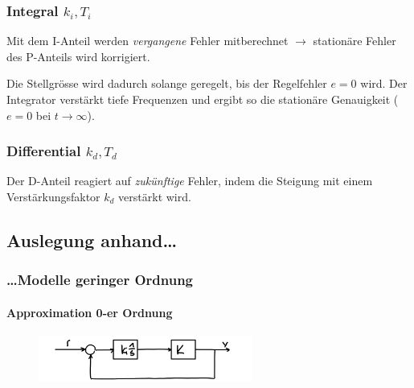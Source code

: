 \documentclass[
  10pt,
  a4paper,
  twocolumn]{article}
\let\oldparagraph\paragraph
\renewcommand{\paragraph}[1]{\oldparagraph{#1}\mbox{}}
\numberwithin{equation}{section}
\let\paragraph\oldparagraph
\renewcommand{\paragraph}[1]{\oldparagraph{#1}\mbox{}\par}
\begin{document}
\hypertarget{k_it_i}{%
\subsubsection{\texorpdfstring{\textcolor{NavyBlue}{Integral}
\(k_i,T_i\)}{ k\_i,T\_i}}\label{k_it_i}}

Mit dem I-Anteil werden \emph{vergangene} Fehler mitberechnet
\(\rightarrow\) stationäre Fehler des P-Anteils wird korrigiert.

Die Stellgrösse wird dadurch solange geregelt, bis der Regelfehler
\(e=0\) wird. Der Integrator verstärkt tiefe Frequenzen und ergibt so
die stationäre Genauigkeit ( \(e=0\) bei \(t\rightarrow\infty\)).

\hypertarget{k_dt_d}{%
\subsubsection{\texorpdfstring{\textcolor{OliveGreen}{Differential}
\(k_d,T_d\)}{ k\_d,T\_d}}\label{k_dt_d}}

Der D-Anteil reagiert auf \emph{zukünftige} Fehler, indem die Steigung
mit einem Verstärkungsfaktor \(k_d\) verstärkt wird.

\newpage

\hypertarget{auslegung-anhand}{%
\subsection{Auslegung anhand\ldots{}}\label{auslegung-anhand}}

\hypertarget{modelle-geringer-ordnung}{%
\subsubsection{\ldots Modelle geringer
Ordnung}\label{modelle-geringer-ordnung}}

\hypertarget{approximation-0-er-ordnung}{%
\paragraph{Approximation 0-er
Ordnung}\label{approximation-0-er-ordnung}}

\begin{figure}[H]

{\centering \includegraphics[width=7cm,height=\textheight]{images/paste-31.png}

}

\end{figure}
\end{document}
